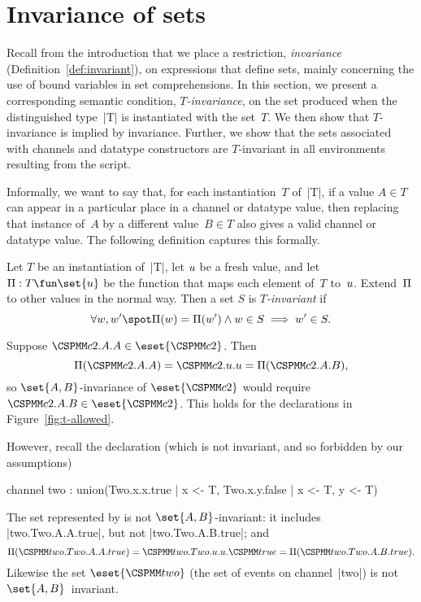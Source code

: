 \section{Invariance of sets}
\label{sec:invariance}

Recall from the introduction that we place a restriction, \emph{invariance}
(Definition~\ref{def:invariant}), on expressions that define sets, mainly
concerning the use of bound variables in set comprehensions.  In this section,
we present a corresponding semantic condition, \emph{$T$-invariance}, on the
set produced when the distinguished type~|T| is instantiated with the set~$T$.
We then show that $T$-invariance is implied by invariance.  Further, we show
that the sets associated with channels and datatype constructors are
$T$-invariant in all environments resulting from the script.

Informally, we want to say that, for each instantiation~$T$ of~|T|, if a value
$A \in T$ can appear in a particular place in a channel or datatype value,
then replacing that instance of~$A$ by a different value~$B \in T$ also gives
a valid channel or datatype value.  
The following definition captures this formally.
%
\begin{definition}
Let $T$ be an instantiation of~|T|, let $u$ be a fresh value, and let
$\unitf : T \fun \set{\unit}$ be the function that maps each element of~$T$
to~$u$. Extend~$\Pi$ to other values in the normal way.  Then a set $S$
is \emph{$T$-invariant} if
\[
\forall w, w' \spot
  \unitf(w) = \unitf(w') \land w \in S  \implies w' \in S.
\]
\end{definition}


\begin{example}
Suppose $\M{c2}.A.A \in \eset{\M{c2}}$.  Then 
\[
\unitf(\M{c2}.A.A) = \M{c2}.\unit.\unit = \unitf(\M{c2}.A.B),
\]
so $\set{A,B}$-invariance of $\eset{\M{c2}}$ would require $\M{c2}.A.B \in
\eset{\M{c2}}$.  This holds for the declarations in
Figure~\ref{fig:t-allowed}.

However, recall the declaration (which is not invariant, and so forbidden by
our assumptions)
%
\begin{cspm}
channel two : union({Two.x.x.true | x <- T}, {Two.x.y.false | x <- T, y <- T})
\end{cspm}
%
The set represented by  is not
$\set{A,B}$-invariant: it includes |two.Two.A.A.true|, but not
|two.Two.A.B.true|; and
\[
\unitf(\M{two.Two.A.A.true}) = \M{two.Two}.u.u.\M{true} =
   \unitf(\M{two.Two.A.B.true}).
\]
Likewise the set $\eset{\M{two}}$ (the set of events on channel~|two|) is not
$\set{A,B}$~invariant. 
\end{example}

